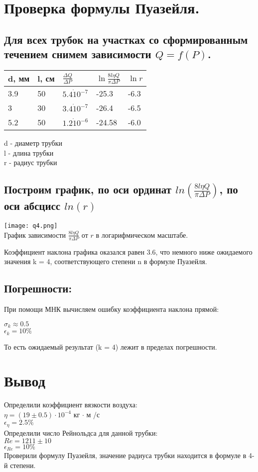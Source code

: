 \documentclass{article}
\begin{document}
\section{Проверка формулы Пуазейля.}
    \subsection{Для всех трубок на участках со сформированным течением снимем зависимости $Q = f(P)$.}
    \begin{center}
        \begin{tabular}{ | l | l | l | l | l |}
            \hline
            d, мм & l, см & $\frac{\Delta Q}{\Delta P}$ & $\ln \frac{8l \eta Q}{\pi \Delta P}$ & $\ln r$ \\ \hline
            3.9 & 50 & $5.4 \dot 10^{-7}$ & -25.3  & -6.3 \\
            3   & 30 & $3.4 \dot 10^{-7}$ & -26.4  & -6.5 \\
            5.2 & 50 & $1.2 \dot 10^{-6}$ & -24.58 & -6.0 \\
            \hline
        \end{tabular}
    \end{center}
    d - диаметр трубки \\
    l - длина трубки \\
    r - радиус трубки
    \subsection{Построим график, по оси ординат $ln(\frac{8l \eta Q}{\pi \Delta P})$, по оси абсцисс $ln(r)$}
    \begin{center}
        \texttt{[image: q4.png]}\\
        График зависимости $\frac{8l \eta Q}{\pi \Delta P}$ от $r$ в логарифмическом масштабе.
    \end{center}   
    Коэффициент наклона графика оказался равен 3.6, что немного ниже ожидаемого значения k = 4, соответствующего степени n в формуле Пуазейля.
    \subsection{Погрешности:}
    При помощи МНК вычисляем ошибку коэффициента наклона прямой:
    \begin{center}
        $\sigma_k \approx 0.5$\\
        $\epsilon_k = 10\%$
    \end{center}   
    То есть ожидаемый результат (k = 4) лежит в пределах погрешности.
\section{Вывод}
Определили коэффициент вязкости воздуха:\\
$\eta = (19 \pm 0.5) \cdot 10^{-4}$ кг $\cdot$ м /с\\
$\epsilon_\eta = 2.5 \%$\\
Определили число Рейнольдса для данной трубки:\\
$Re = 1211 \pm  10$\\
$\epsilon_{Re} = 10\%$\\
Проверили формулу Пуазейля, значение радиуса трубки находится в формуле в 4-й степени.
\end{document}

